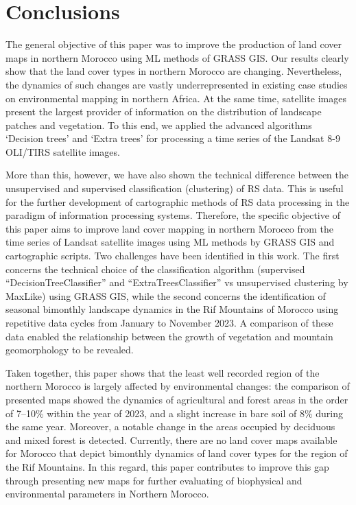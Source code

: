 \documentclass[geomatics,article,accept,pdftex,oneauthor]{Definitions/mdpi}
\begin{document}
\section{Conclusions}

The general objective of this paper was to improve the production of land cover maps in northern Morocco using ML methods of GRASS GIS. Our results clearly show that the land cover types in northern Morocco are changing. Nevertheless, the dynamics of such changes are vastly underrepresented in existing case studies on environmental mapping in northern Africa. At the same time, satellite images present the largest provider of information on the distribution of landscape patches and vegetation. To this end, we applied the advanced algorithms `Decision trees' and `Extra trees' for processing a time series of the Landsat 8-9 OLI/TIRS satellite images. 

More than this, however, we have also shown the technical difference between the unsupervised and supervised classification (clustering) of RS data. This is useful for the further development of cartographic methods of RS data processing in the paradigm of information processing systems. Therefore, the specific objective of this paper aims to improve land cover mapping in northern Morocco from the time series of Landsat satellite images using ML methods by GRASS GIS and cartographic scripts. Two challenges have been identified in this work. The first concerns the technical choice of the classification algorithm (supervised “DecisionTreeClassifier” and “ExtraTreesClassifier” vs unsupervised clustering by MaxLike) using GRASS GIS, while the second concerns the identification of seasonal bimonthly landscape dynamics in the Rif Mountains of Morocco using repetitive data cycles from January to November 2023. A comparison of these data enabled the relationship between the growth of vegetation and mountain geomorphology to be revealed.

Taken together, this paper shows that the least well recorded region of the northern Morocco is largely affected by environmental changes: the comparison of presented maps showed the dynamics of agricultural and forest areas in the order of 7--10\% within the year of 2023, and a slight increase in bare soil of 8\% during the same year. Moreover, a notable change in the areas occupied by deciduous and mixed forest is detected. Currently, there are no land cover maps available for Morocco that depict bimonthly dynamics of land cover types for the region of the Rif Mountains. In this regard, this paper contributes to improve this gap through presenting new maps for further evaluating of biophysical and environmental parameters in Northern Morocco.
\end{document}
